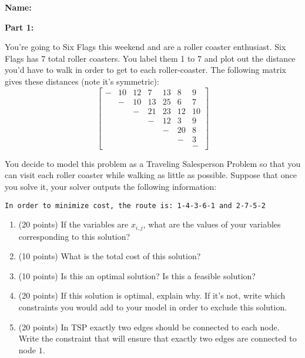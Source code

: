 \documentclass[letterpaper,oneside,12pt]{article}%
\begin{document}
\noindent{}

\vspace{3mm} \hspace{\fill} \textbf{Name: \underline{\hspace{6cm}}}

\textbf{Part 1:}

You're going to Six Flags this weekend and are a roller coaster enthusiast. Six Flags has 7 total roller coasters. You label them 1 to 7 and plot out the distance you'd have to walk in order to get to each roller-coaster. The following matrix gives these distances (note it's symmetric):
\[
\begin{bmatrix}
-& 10 & 12 & 7  & 13 & 8  & 9 \\
 & -  & 10 & 13 & 25 & 6  & 7 \\
 &    & -  & 21 & 23 & 12 & 10 \\
 &    &    & -  & 12 & 3  & 9   \\
 &    &    &    & -  & 20 & 8   \\
 &    &    &    &    & -  & 3   \\
 &    &    &    &    &    & -
\end{bmatrix}
\]

You decide to model this problem as a Traveling Salesperson Problem so that you can visit each roller coaster while walking as little as possible. Suppose that once you solve it, your solver outputs the following information:

\verb|In order to minimize cost, the route is: 1-4-3-6-1 and 2-7-5-2|

\begin{enumerate}
\item (20 points) If the variables are $x_{i,j}$, what are the values of your variables corresponding to this solution? \vfill
\item (10 points)  What is the total cost of this solution? \vfill
\item (10 points) Is this an optimal solution? Is this a feasible solution? \vfill
\newpage
\item (20 points) If this solution is optimal, explain why. If it's not, write which constraints you would add to your model in order to exclude this solution. \vfill
\item (20 points) In TSP exactly two edges should be connected to each node. Write the constraint that will ensure that exactly two edges are connected  to node $1$. \vfill
\end{enumerate}
\end{document}
